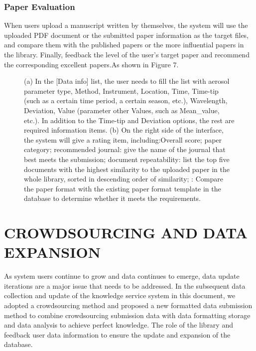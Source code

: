 \subsubsection{Paper Evaluation}
When users upload a manuscript written by themselves, the system will use the uploaded PDF document or the submitted paper information as the target files,  and compare them with the published papers or the more influential papers in the library. Finally, feedback the level of the user's target paper and recommend the corresponding excellent papers.As shown in Figure 7.
\begin{figure}
	\centering
	\caption{(a) In the [Data info] list, the user needs to fill the list with  aerosol parameter type, Method, Instrument, Location, Time, Time-tip (such as a certain time period, a certain season, etc.), Wavelength, Deviation, Value (parameter other Values, such as Mean\_value, etc.). In addition to the Time-tip and Deviation options, the rest are required information items.
	(b) On the right side of the interface, the system will give a rating item, including:Overall score; paper category; recommended journal: give the name of the journal that best meets the submission; document repeatability: list the top five documents with the highest similarity to the uploaded paper in the whole library, sorted in descending order of similarity; : Compare the paper format with the existing paper format template in the database to determine whether it meets the requirements.}
\end{figure}


\section{CROWDSOURCING AND DATA EXPANSION}
As system users continue to grow and data continues to emerge, data update iterations are a major issue that needs to be addressed. In the subsequent data collection and update of the knowledge service system in this document, we adopted a crowdsourcing method and proposed a new formatted data submission method to combine crowdsourcing submission data with data formatting storage and data analysis to achieve perfect knowledge. The role of the library and feedback user data information to ensure the update and expansion of the database.

